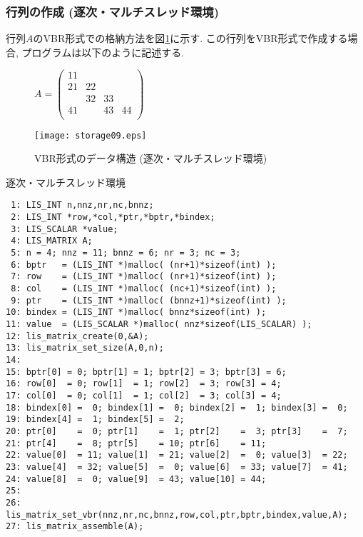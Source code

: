 \documentclass[a4paper]{jarticle}
\begin{document}
{{\begin{itemize}
\subsubsection{行列の作成 (逐次・マルチスレッド環境)}
行列$A$のVBR形式での格納方法を図\ref{fig:storage09}に示す. 
この行列をVBR形式で作成する場合, プログラムは以下のように記述する. 
\end{itemize}
\begin{figure}[h]
{\centering 
\begin{minipage}{0.3\textwidth}
\begin{flushright}
$ 
A = \left(
\begin{array}{c|cc|c}
11 &    &    &    \\ \hline
21 & 22 &    &    \\
   & 32 & 33 &    \\ \hline
41 &    & 43 & 44 \\
\end{array}\right)
$
\end{flushright}
\end{minipage}
\begin{minipage}{0.6\textwidth}
\begin{flushleft}
\texttt{[image: storage09.eps]} 
\end{flushleft}
\end{minipage}
\caption{VBR形式のデータ構造 (逐次・マルチスレッド環境)}\label{fig:storage09}}
\end{figure}
\begin{itembox}[l]{逐次・マルチスレッド環境}
\small
\begin{verbatim}
 1: LIS_INT n,nnz,nr,nc,bnnz;
 2: LIS_INT *row,*col,*ptr,*bptr,*bindex;
 3: LIS_SCALAR *value;
 4: LIS_MATRIX A;
 5: n = 4; nnz = 11; bnnz = 6; nr = 3; nc = 3;
 6: bptr   = (LIS_INT *)malloc( (nr+1)*sizeof(int) );
 7: row    = (LIS_INT *)malloc( (nr+1)*sizeof(int) );
 8: col    = (LIS_INT *)malloc( (nc+1)*sizeof(int) );
 9: ptr    = (LIS_INT *)malloc( (bnnz+1)*sizeof(int) );
10: bindex = (LIS_INT *)malloc( bnnz*sizeof(int) );
11: value  = (LIS_SCALAR *)malloc( nnz*sizeof(LIS_SCALAR) );
12: lis_matrix_create(0,&A);
13: lis_matrix_set_size(A,0,n);
14:
15: bptr[0] = 0; bptr[1] = 1; bptr[2] = 3; bptr[3] = 6;
16: row[0]  = 0; row[1]  = 1; row[2]  = 3; row[3] = 4;
17: col[0]  = 0; col[1]  = 1; col[2]  = 3; col[3] = 4;
18: bindex[0] =  0; bindex[1] =  0; bindex[2] =  1; bindex[3] =  0;
19: bindex[4] =  1; bindex[5] =  2;
20: ptr[0]    =  0; ptr[1]    =  1; ptr[2]    =  3; ptr[3]    =  7;
21: ptr[4]    =  8; ptr[5]    = 10; ptr[6]    = 11;
22: value[0]  = 11; value[1]  = 21; value[2]  =  0; value[3]  = 22;
23: value[4]  = 32; value[5]  =  0; value[6]  = 33; value[7]  = 41;
24: value[8]  =  0; value[9]  = 43; value[10] = 44;
25:
26: lis_matrix_set_vbr(nnz,nr,nc,bnnz,row,col,ptr,bptr,bindex,value,A);
27: lis_matrix_assemble(A);
\end{verbatim}
\end{itembox}

}}
\end{document}
